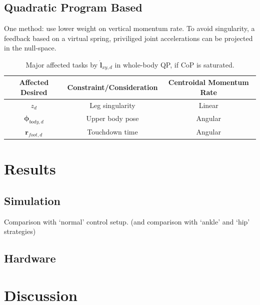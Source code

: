 \subsection{Quadratic Program Based}
One method: use lower weight on vertical momentum rate. To avoid singularity, a feedback based on a virtual spring, priviliged joint accelerations can be projected in the null-space. 

\begin{table}[ht]
\caption{Major affected tasks by $\mathbf{\dot{l}}_{xy,d}$ in whole-body QP, if \ac{CoP} is saturated.} %
\centering %
\begin{tabular}{c c c } %
\hline\hline %
Affected Desired & Constraint/Consideration & Centroidal Momentum Rate \\
\hline %
 $z_d$ & Leg singularity & Linear\\
 $\boldsymbol{\phi}_{body,d}$ & Upper body pose & Angular\\
 $\mathbf{r}_{foot,d}$ &  Touchdown time & Angular\\
\hline %
\end{tabular}
\label{tab:eatqp} %
\end{table}


\section{Results}
\subsection{Simulation}
Comparison with `normal' control setup. (and comparison with `ankle' and `hip' strategies)
\subsection{Hardware}

\section{Discussion}
